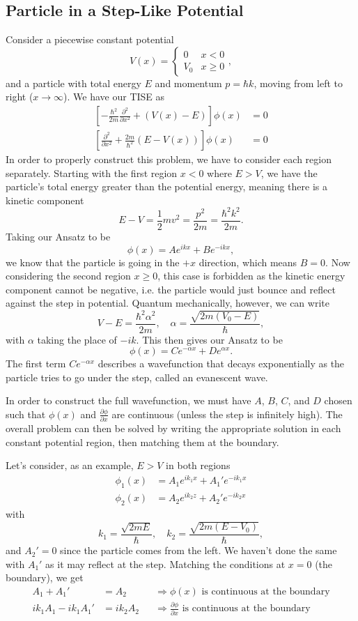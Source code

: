 \documentclass{article}
\begin{document}
\subsection{Particle in a Step-Like Potential}
Consider a piecewise constant potential
\[
    V(x)=\begin{cases}
        0 & x<0 \\
        V_0 & x\geq 0
    \end{cases},
\]
and a particle with total energy $E$ and momentum $p=\hbar k$, moving from left to right ($x\to \infty$). We have our TISE as
\begin{align*}
    \left[ -\frac{\hbar^2}{2m} \frac{\partial^2}{\partial x^2}+(V(x)-E) \right]\phi (x)&=0 \\
    \left[ \frac{\partial^2}{\partial x^2}+\frac{2m}{\hbar^2}(E-V(x)) \right]\phi (x)&=0
\end{align*}
In order to properly construct this problem, we have to consider each region separately. Starting with the first region $x<0$ where $E>V$, we have the particle's total energy greater than the potential energy, meaning there is a kinetic component
\[
    E-V=\frac{1}{2}mv^2=\frac{p^2}{2m}=\frac{\hbar^2k^2}{2m}.
\]
Taking our Ansatz to be
\[
    \phi (x)=Ae^{ikx}+Be^{-ikx},
\]
we know that the particle is going in the $+x$ direction, which means $B=0$. Now considering the second region $x\geq 0$, this case is forbidden as the kinetic energy component cannot be negative, i.e. the particle would just bounce and reflect against the step in potential. Quantum mechanically, however, we can write
\[
    V-E=\frac{\hbar^2\alpha^2}{2m},\quad \alpha =\frac{\sqrt{2m(V_0-E)}}{\hbar},
\]
with $\alpha $ taking the place of $-ik$. This then gives our Ansatz to be
\[
    \phi (x)=Ce^{-\alpha x}+De^{\alpha x}.
\]
The first term $Ce^{-\alpha x}$ describes a wavefunction that decays exponentially as the particle tries to go under the step, called an evanescent wave.

In order to construct the full wavefunction, we must have $A$, $B$, $C$, and $D$ chosen such that $\phi (x)$ and $\frac{\partial \phi }{\partial x}$ are continuous (unless the step is infinitely high). The overall problem can then be solved by writing the appropriate solution in each constant potential region, then matching them at the boundary.

Let's consider, as an example, $E>V$ in both regions
\begin{align*}
    \phi_1(x) &= A_1e^{ik_1x}+A_1'e^{-ik_1x} \\
    \phi_2(x) &= A_2e^{ik_2z}+A_2'e^{-ik_2x}
\end{align*}
with
\[
    k_1=\frac{\sqrt{2mE}}{\hbar},\quad k_2=\frac{\sqrt{2m(E-V_0)}}{\hbar},
\]
and $A_2'=0$ since the particle comes from the left. We haven't done the same with $A_1'$ as it may reflect at the step. Matching the conditions at $x=0$ (the boundary), we get
\begin{align*}
    A_1+A_1'&=A_2& &\Rightarrow\phi (x) \text{ is continuous at the boundary} \\
    ik_1A_1-ik_1A_1'&=ik_2A_2& &\Rightarrow \frac{\partial \phi }{\partial x}\text{ is continuous at the boundary}
\end{align*}
\end{document}
